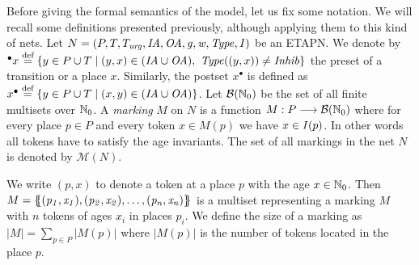Before giving the formal semantics of the model, let us fix some notation.
We will recall some definitions presented previously, although applying them
to this kind of nets.
Let $N = (P, T, T_{\mathit{urg}}, \mathit{IA},\allowbreak \mathit{OA}, \mathit{g}, \mathit{w}, \mathit{Type}, \mathit{I})$ be an ETAPN. 
We denote by ${}^\bullet x \stackrel{\textrm{def}}{=} 
\{y \in P \cup T \mid (y,x) \in (\mathit{IA} \cup \mathit{OA}),\ \mathit{Type}((y,x)) \neq \mathit{Inhib} \}$ 
the preset of a transition or a place $x$.
Similarly, the postset $x^\bullet$ is defined as 
$x^\bullet \stackrel{\textrm{def}}{=} \{y \in P \cup T \mid (x,y) \in (\mathit{IA} \cup \mathit{OA}) \}$.
Let $\mathcal{B}(\mathbb{N}_{0})$ be the set 
of all finite multisets over $\mathbb{N}_{0}$. A \emph{marking} $M$ on $N$ 
is a function $M : P \longrightarrow \mathcal{B}(\mathbb{N}_{0})$ 
where for every place $p \in P$ and 
every token $x \in M(p)$ we have $x \in \mathit{I}(p)$. In other words
all tokens have to satisfy the age invariants. 
The set of all markings in the net $N$ 
is denoted by $\mathcal{M}(N)$.

We write $(p,x)$ to denote a token at a place $p$ with the 
age $x\in \mathbb{N}_{0}$. Then $M=\mathit{\{\!\!\{(p_1,x_1),(p_2,x_2),\dots ,(p_n,x_n)\}\!\!\}}$ 
is a multiset representing a marking $M$ with $n$ tokens of 
ages $x_i$ in places $p_i$. We 
define the size of a marking as $|M| = \sum_{p\in P}|M(p)|$ where 
$|M(p)|$ is the number of tokens located in the place $p$.


